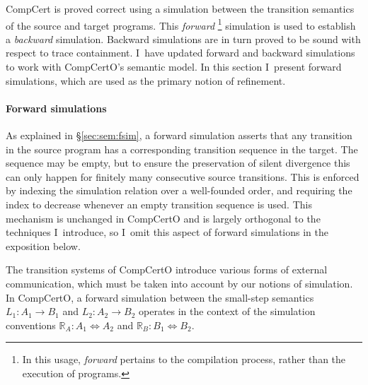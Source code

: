 \documentclass[11pt,oneside]{book}
\theoremstyle{definition}
\newcommand{\kw}[1]{\ensuremath{ \mathsf{#1} }}
\begin{document}
CompCert is proved correct using a simulation
between the transition semantics of the source and target programs.
This \emph{forward}%
\footnote{In this usage, \emph{forward} pertains to
  the compilation process,
  rather than the execution of programs.}
simulation is used to establish a \emph{backward} simulation.
Backward simulations
are in turn proved to be sound with respect to trace containment.
I~have updated forward and backward simulations to
work with CompCertO's semantic model.
In this section I~present forward simulations,
which are used as the primary notion of refinement.


\paragraph{Forward simulations} %

As explained in \S\ref{sec:sem:fsim},
a forward simulation asserts that any transition in the source program
has a corresponding transition sequence in the target.
The sequence may be empty,
but to ensure the preservation of silent divergence
this can only happen for finitely many consecutive source transitions.
This is enforced by indexing the simulation relation
over a well-founded order,
and requiring the index to decrease
whenever an empty transition sequence is used.
This mechanism is unchanged in CompCertO
and is largely orthogonal to the techniques I~introduce,
so I~omit this aspect of forward simulations
in the exposition below.

The transition systems of CompCertO introduce
various forms of external communication,
which must be taken into account by our notions of simulation.
In CompCertO,
a forward simulation between the small-step semantics
$L_1 : A_1 \rightarrow B_1$ and
$L_2 : A_2 \rightarrow B_2$
operates in the context of the simulation conventions
$\mathbb{R}_A : A_1 \Leftrightarrow A_2$ and
$\mathbb{R}_B : B_1 \Leftrightarrow B_2$.
\end{document}
